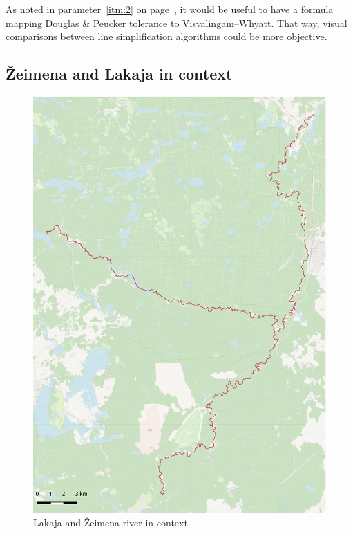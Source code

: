 \documentclass[a4paper]{article}
\newcommand{\DP}{Douglas \& Peucker}
\newcommand{\VW}{Visvalingam--Whyatt}
\begin{document}
As noted in parameter~\ref{itm:2} on page~\pageref{itm:2}, it would be useful
to have a formula mapping {\DP} tolerance to {\VW}. That way, visual
comparisons between line simplification algorithms could be more objective.

\printbibliography

\begin{appendices}

\section{Žeimena and Lakaja in context}

\begin{figure}[H]
    \centering
    \includegraphics[width=148mm]{zeimena-pretty}
    \caption{Lakaja and Žeimena river in context}
\end{figure}


\end{appendices}
\end{document}
